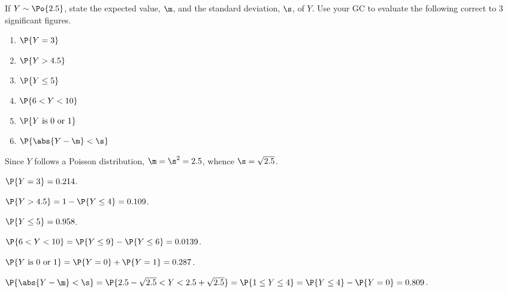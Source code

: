 \begin{problem}
    If $Y \sim \Po{2.5}$, state the expected value, $\m$, and the standard deviation, $\s$, of $Y$. Use your GC to evaluate the following correct to 3 significant figures.
    \begin{enumerate}
        \item $\P{Y = 3}$
        \item $\P{Y > 4.5}$
        \item $\P{Y \leq 5}$
        \item $\P{6 < Y < 10}$
        \item $\P{Y \text{ is 0 or 1}}$
        \item $\P{\abs{Y - \m} < \s}$
    \end{enumerate}
\end{problem}
\begin{solution}
    Since $Y$ follows a Poisson distribution, $\m = \s^2 = 2.5$, whence $\s = \sqrt{2.5}$.

    \begin{ppart}
        $\P{Y = 3} = 0.214$.
    \end{ppart}
    \begin{ppart}
        $\P{Y > 4.5} = 1- \P{Y \leq 4} = 0.109$.
    \end{ppart}
    \begin{ppart}
        $\P{Y \leq 5} = 0.958$.
    \end{ppart}
    \begin{ppart}
        $\P{6 < Y < 10} = \P{Y \leq 9} - \P{Y \leq 6} = 0.0139$.
    \end{ppart}
    \begin{ppart}
        $\P{Y \text{ is 0 or 1}} = \P{Y = 0} + \P{Y = 1} = 0.287$.
    \end{ppart}
    \begin{ppart}
        $\P{\abs{Y - \m} < \s} = \P{2.5 - \sqrt{2.5} < Y < 2.5 + \sqrt{2.5}} = \P{1 \leq Y \leq 4} = \P{Y \leq 4} - \P{Y = 0} = 0.809$.
    \end{ppart}
\end{solution}

